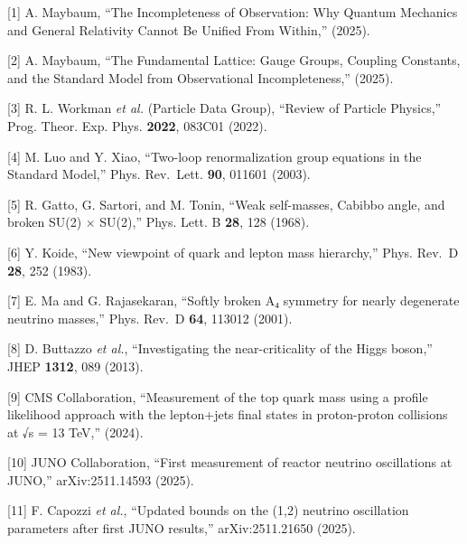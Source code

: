 \documentclass[
  11pt,
]{article}
\begin{document}
{[}1{]} A. Maybaum, ``The Incompleteness of Observation: Why Quantum
Mechanics and General Relativity Cannot Be Unified From Within,''
(2025).

{[}2{]} A. Maybaum, ``The Fundamental Lattice: Gauge Groups, Coupling
Constants, and the Standard Model from Observational Incompleteness,''
(2025).

{[}3{]} R. L. Workman \emph{et al.} (Particle Data Group), ``Review of
Particle Physics,'' Prog. Theor. Exp. Phys. \textbf{2022}, 083C01
(2022).

{[}4{]} M. Luo and Y. Xiao, ``Two-loop renormalization group equations
in the Standard Model,'' Phys. Rev.~Lett. \textbf{90}, 011601 (2003).

{[}5{]} R. Gatto, G. Sartori, and M. Tonin, ``Weak self-masses, Cabibbo
angle, and broken SU(2) × SU(2),'' Phys. Lett. B \textbf{28}, 128
(1968).

{[}6{]} Y. Koide, ``New viewpoint of quark and lepton mass hierarchy,''
Phys. Rev.~D \textbf{28}, 252 (1983).

{[}7{]} E. Ma and G. Rajasekaran, ``Softly broken A₄ symmetry for nearly
degenerate neutrino masses,'' Phys. Rev.~D \textbf{64}, 113012 (2001).

{[}8{]} D. Buttazzo \emph{et al.}, ``Investigating the near-criticality
of the Higgs boson,'' JHEP \textbf{1312}, 089 (2013).

{[}9{]} CMS Collaboration, ``Measurement of the top quark mass using a
profile likelihood approach with the lepton+jets final states in
proton-proton collisions at √s = 13 TeV,'' (2024).

{[}10{]} JUNO Collaboration, ``First measurement of reactor neutrino
oscillations at JUNO,'' arXiv:2511.14593 (2025).

{[}11{]} F. Capozzi \emph{et al.}, ``Updated bounds on the (1,2)
neutrino oscillation parameters after first JUNO results,''
arXiv:2511.21650 (2025).
\end{document}
